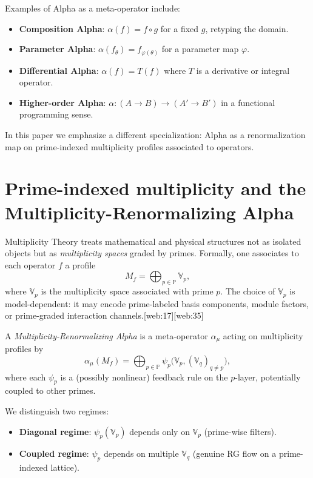 \documentclass[11pt]{article}
\begin{document}
Examples of Alpha as a meta-operator include:
\begin{itemize}
    \item \textbf{Composition Alpha}: $\alpha(f) = f \circ g$ for a fixed $g$, retyping the domain.
    \item \textbf{Parameter Alpha}: $\alpha(f_\theta) = f_{\varphi(\theta)}$ for a parameter map $\varphi$.
    \item \textbf{Differential Alpha}: $\alpha(f) = T(f)$ where $T$ is a derivative or integral operator.
    \item \textbf{Higher-order Alpha}: $\alpha : (A \to B) \to (A' \to B')$ in a functional programming sense.
\end{itemize}

In this paper we emphasize a different specialization: Alpha as a renormalization map on prime-indexed multiplicity profiles associated to operators.


\section{Prime-indexed multiplicity and the Multiplicity-Renormalizing Alpha}

Multiplicity Theory treats mathematical and physical structures not as isolated objects but as \emph{multiplicity spaces} graded by primes.
Formally, one associates to each operator $f$ a profile
\begin{equation}
    M_f = \bigoplus_{p \in \mathbb{P}} \mathbb{V}_p,
\end{equation}
where $\mathbb{V}_p$ is the multiplicity space associated with prime $p$.
The choice of $\mathbb{V}_p$ is model-dependent: it may encode prime-labeled basis components, module factors, or prime-graded interaction channels.[web:17][web:35]

\begin{definition}
A \emph{Multiplicity-Renormalizing Alpha} is a meta-operator $\alpha_\mu$ acting on multiplicity profiles by
\begin{equation}
    \alpha_\mu(M_f) = \bigoplus_{p \in \mathbb{P}} \psi_p\big(\mathbb{V}_p, (\mathbb{V}_q)_{q \neq p}\big),
\end{equation}
where each $\psi_p$ is a (possibly nonlinear) feedback rule on the $p$-layer, potentially coupled to other primes.
\end{definition}

We distinguish two regimes:
\begin{itemize}
    \item \textbf{Diagonal regime}: $\psi_p(\mathbb{V}_p)$ depends only on $\mathbb{V}_p$ (prime-wise filters).
    \item \textbf{Coupled regime}: $\psi_p$ depends on multiple $\mathbb{V}_q$ (genuine RG flow on a prime-indexed lattice).
\end{itemize}
\end{document}
